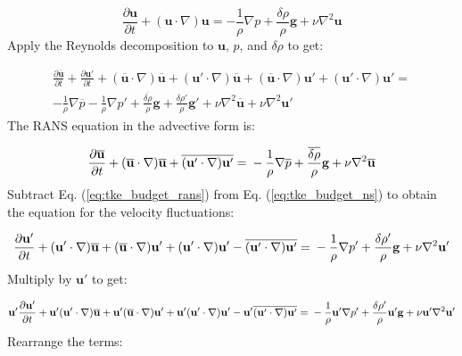 \documentclass[12pt]{article}
\numberwithin{equation}{section}
\numberwithin{figure}{section}
\numberwithin{table}{section}
\begin{document}
\begin{equation}
  \frac{\partial \mathbf{u}}{\partial t} + 
  (\mathbf{u} \cdot \nabla) \mathbf{u} =
  - \frac{1}{\rho} \nabla p
  + \frac{\delta \rho}{\rho} \mathbf{g}
  + \nu \nabla^2 \mathbf{u}
\end{equation}
Apply the Reynolds decomposition to $\mathbf{u}$, $p$, and $\delta \rho$ to get:

\begin{equation}
  \begin{split}
  \frac{\partial \overline{\mathbf{u}}}{\partial t} + \frac{\partial \mathbf{u}'}{\partial t} +
  (\overline{\mathbf{u}} \cdot \nabla) \overline{\mathbf{u}} +
  (\mathbf{u}' \cdot \nabla) \overline{\mathbf{u}} +
  (\overline{\mathbf{u}} \cdot \nabla) \mathbf{u}' +
  (\mathbf{u}' \cdot \nabla) \mathbf{u}' = \\
  - \frac{1}{\rho} \nabla \overline{p}
  - \frac{1}{\rho} \nabla p'
  + \frac{\overline{\delta \rho}}{\rho} \mathbf{g}
  + \frac{\delta \rho'}{\rho} \mathbf{g}'
  + \nu \nabla^2 \overline{\mathbf{u}}
  + \nu \nabla^2 \mathbf{u}'
  \end{split}
  \label{eq:tke_budget_ns}
\end{equation}
The RANS equation in the advective form is:

\begin{equation}
  \frac{\partial \overline{\mathbf{u}}}{\partial t} +
  (\overline{\mathbf{u}} \cdot \nabla) \overline{\mathbf{u}} +
  \overline{(\mathbf{u}' \cdot \nabla) \mathbf{u}'} = \\
  - \frac{1}{\rho} \nabla \overline{p}
  + \frac{\overline{\delta \rho}}{\rho} \mathbf{g}
  + \nu \nabla^2 \overline{\mathbf{u}}
  \label{eq:tke_budget_rans}
\end{equation}
Subtract Eq. (\ref{eq:tke_budget_rans}) from Eq. (\ref{eq:tke_budget_ns}) to
obtain the equation for the velocity fluctuations:

\begin{equation}
  \frac{\partial \mathbf{u}'}{\partial t} +
  (\mathbf{u}' \cdot \nabla) \overline{\mathbf{u}} +
  (\overline{\mathbf{u}} \cdot \nabla) \mathbf{u}' +
  (\mathbf{u}' \cdot \nabla) \mathbf{u}' -
  \overline{(\mathbf{u}' \cdot \nabla) \mathbf{u}'} = \\
  - \frac{1}{\rho} \nabla p'
  + \frac{\delta \rho'}{\rho} \mathbf{g}
  + \nu \nabla^2 \mathbf{u}'
\end{equation}
Multiply by $\mathbf{u}'$ to get:

\begin{equation}
  \mathbf{u}'\frac{\partial \mathbf{u}'}{\partial t} +
  \mathbf{u}' (\mathbf{u}' \cdot \nabla) \overline{\mathbf{u}} +
  \mathbf{u}' (\overline{\mathbf{u}} \cdot \nabla) \mathbf{u}' +
  \mathbf{u}' (\mathbf{u}' \cdot \nabla) \mathbf{u}' -
  \mathbf{u}' \overline{(\mathbf{u}' \cdot \nabla) \mathbf{u}'} = \\
  - \frac{1}{\rho} \mathbf{u}' \nabla p'
  + \frac{\delta \rho'}{\rho} \mathbf{u}' \mathbf{g}
  + \nu \mathbf{u}' \nabla^2 \mathbf{u}'
\end{equation}
Rearrange the terms:
\end{document}
